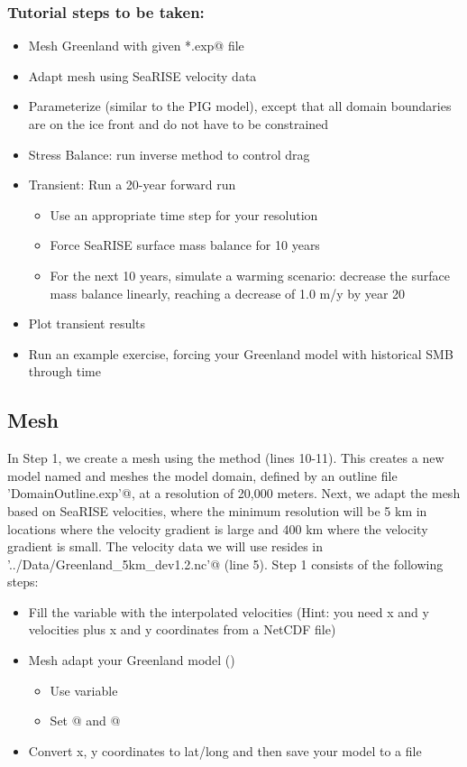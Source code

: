 \subsubsection{Tutorial steps to be taken:}
\begin{itemize}
	\item Mesh Greenland with given \verb@*.exp@ file
	\item Adapt mesh using SeaRISE velocity data
	\item Parameterize (similar to the PIG model), except that all domain boundaries are on the ice
		front and do not have to be constrained
	\item Stress Balance: run inverse method to control drag
	\item Transient: Run a 20-year forward run
		\begin{itemize}
			\item Use an appropriate time step for your resolution
			\item Force SeaRISE surface mass balance for 10 years
			\item For the next 10 years, simulate a warming scenario: decrease the surface mass balance
				linearly, reaching a decrease of 1.0 m/y by year 20
		\end{itemize}
	\item Plot transient results
	\item Run an example exercise, forcing your Greenland model with historical SMB through time
\end{itemize}
\subsection{Mesh} %
In Step 1, we create a mesh using the \verb@triangle@ method (lines 10-11). This creates a new model named \verb@md@ and meshes the model domain, defined by an outline file \verb@'DomainOutline.exp'@, at a resolution of 20,000 meters. Next, we adapt the mesh based on SeaRISE velocities, where the minimum resolution will be 5 km in locations where the velocity gradient is large and 400 km where the velocity gradient is small. The velocity data we will use resides in \verb@'../Data/Greenland_5km_dev1.2.nc'@ (line 5). Step 1 consists of the following steps:
\begin{itemize}
	\item Fill the variable \verb@vel@ with the interpolated velocities (Hint: you need x and y velocities plus x and y coordinates from a NetCDF file)
	\item Mesh adapt your Greenland model (\verb@bamg@)
		\begin{itemize}
			\item Use variable \verb@vel@
			\item Set @ and @
		\end{itemize}
	\item Convert x, y coordinates to lat/long and then save your model to a file
\end{itemize}

